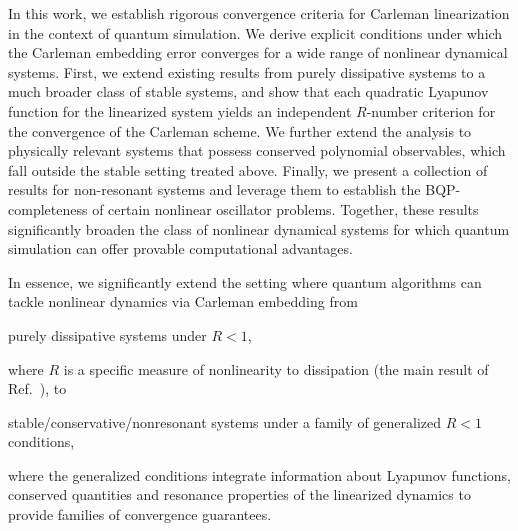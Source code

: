 \documentclass[superscriptaddress,onecolumn,nofootinbib,longbibliography,a4paper,accepted=2026-09-29]{quantumarticle}
\theoremstyle{plain}
\theoremstyle{definition}
\numberwithin{thm}{section}
\numberwithin{assumption}{section}
\numberwithin{lemma}{section}
\numberwithin{prop}{section}
\numberwithin{cor}{section}
\numberwithin{definition}{section}
\numberwithin{rmk}{section}
\numberwithin{equation}{section}
\begin{document}
In this work, we establish rigorous convergence criteria for Carleman linearization in the context of quantum simulation. We derive explicit conditions under which the Carleman embedding error converges for a wide range of nonlinear dynamical systems. First, we extend existing results from purely dissipative systems to a much broader class of stable systems, and show that each quadratic Lyapunov function for the linearized system yields an independent $R$-number criterion for the convergence of the Carleman scheme. We further extend the analysis to physically relevant systems that possess conserved polynomial observables, which fall outside the stable setting treated above. Finally, we present a collection of results for non-resonant systems and leverage them to establish the BQP-completeness of certain nonlinear oscillator problems. Together, these results significantly broaden the class of nonlinear dynamical systems for which quantum simulation can offer provable computational advantages.

In essence, we significantly extend the setting where quantum algorithms can tackle nonlinear dynamics via Carleman embedding from 
\begin{center}
    \begin{tcolorbox}[
      colback=quantumviolet!15,
      colframe=quantumviolet,
      boxrule=0.9pt,            %
      arc=2pt,                  %
      left=8pt,right=8pt,       %
      top=6pt,bottom=6pt,       %
      width=0.5\linewidth,         %
    ]
        purely dissipative systems under  $R<1$,
    \end{tcolorbox}
\end{center}
\noindent where $R$ is a specific measure of nonlinearity to dissipation (the main result of Ref.~\cite{liu2021efficient}), to  
\begin{center}
    \begin{tcolorbox}[
      colback=quantumviolet!15,
    colframe=quantumviolet,
      boxrule=0.9pt,            %
      arc=2pt,                  %
      left=8pt,right=8pt,       %
      top=6pt,bottom=6pt,       %
      width=0.95\linewidth,         %
    ]
        stable/conservative/nonresonant systems under a family of generalized $R<1$ conditions,
    \end{tcolorbox}
\end{center}
where the generalized conditions integrate information about Lyapunov functions, conserved quantities and resonance properties of the linearized dynamics to provide families of convergence guarantees.
\end{document}
